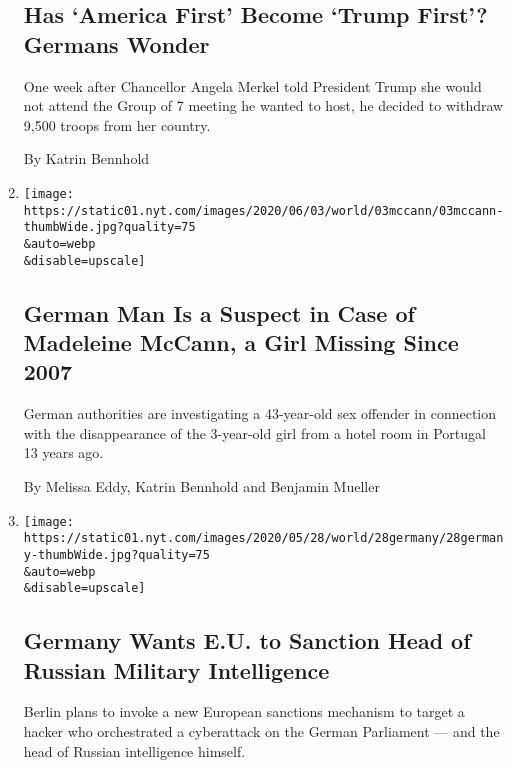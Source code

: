 \begin{enumerate}
{  \subsection{Has `America First' Become `Trump First'? Germans
  Wonder}\label{has-america-first-become-trump-first-germans-wonder}}

  One week after Chancellor Angela Merkel told President Trump she would
  not attend the Group of 7 meeting he wanted to host, he decided to
  withdraw 9,500 troops from her country.

  By Katrin Bennhold
\item
  \href{/2020/06/03/world/europe/madeline-mccann-missing-germany-portugal.html}{}

  \texttt{[image: https://static01.nyt.com/images/2020/06/03/world/03mccann/03mccann-thumbWide.jpg?quality=75\\\&auto=webp\\\&disable=upscale]}

  \hypertarget{german-man-is-a-suspect-in-case-of-madeleine-mccann-a-girl-missing-since-2007}{%
  \subsection{German Man Is a Suspect in Case of Madeleine McCann, a
  Girl Missing Since
  2007}\label{german-man-is-a-suspect-in-case-of-madeleine-mccann-a-girl-missing-since-2007}}

  German authorities are investigating a 43-year-old sex offender in
  connection with the disappearance of the 3-year-old girl from a hotel
  room in Portugal 13 years ago.

  By Melissa Eddy, Katrin Bennhold and Benjamin Mueller
\item
  \href{/2020/05/28/world/europe/germany-russia-cyberattack-sanctions.html}{}

  \texttt{[image: https://static01.nyt.com/images/2020/05/28/world/28germany/28germany-thumbWide.jpg?quality=75\\\&auto=webp\\\&disable=upscale]}

  \hypertarget{germany-wants-eu-to-sanction-head-of-russian-military-intelligence}{%
  \subsection{Germany Wants E.U. to Sanction Head of Russian Military
  Intelligence}\label{germany-wants-eu-to-sanction-head-of-russian-military-intelligence}}

  Berlin plans to invoke a new European sanctions mechanism to target a
  hacker who orchestrated a cyberattack on the German Parliament --- and
  the head of Russian intelligence himself.


\end{enumerate}
